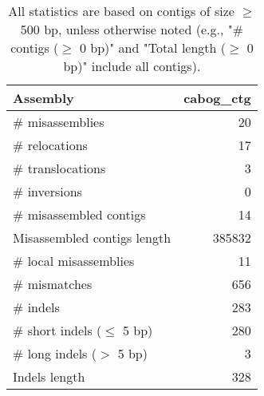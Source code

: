 \documentclass[12pt,a4paper]{article}
\begin{document}
\begin{table}[ht]
\begin{center}
\caption{All statistics are based on contigs of size $\geq$ 500 bp, unless otherwise noted (e.g., "\# contigs ($\geq$ 0 bp)" and "Total length ($\geq$ 0 bp)" include all contigs).}
\begin{tabular}{|l*{1}{|r}|}
\hline
Assembly & cabog\_ctg \\ \hline
\# misassemblies & 20 \\ \hline
\hspace{5mm}\# relocations & 17 \\ \hline
\hspace{5mm}\# translocations & 3 \\ \hline
\hspace{5mm}\# inversions & 0 \\ \hline
\# misassembled contigs & 14 \\ \hline
Misassembled contigs length & 385832 \\ \hline
\# local misassemblies & 11 \\ \hline
\# mismatches & 656 \\ \hline
\# indels & 283 \\ \hline
\hspace{5mm}\# short indels ($\leq$ 5 bp) & 280 \\ \hline
\hspace{5mm}\# long indels ($>$ 5 bp) & 3 \\ \hline
Indels length & 328 \\ \hline
\end{tabular}
\end{center}
\end{table}
\end{document}
